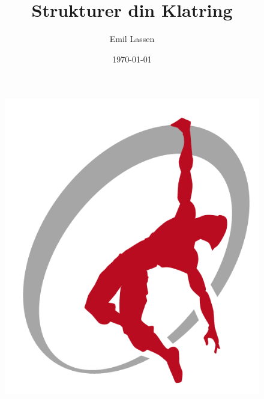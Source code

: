 \documentclass[12pt,a4paper]{article}
\title{\sc Strukturer din Klatring}
\author{Emil Lassen}
\date{\today}
\begin{document}
\maketitle
\vfill
\begin{figure}[h!]
  \raggedleft
  \includegraphics[width=.6\textwidth]{figs/aak}
\end{figure}
\clearpage


\clearpage


\clearpage


\clearpage


\clearpage


\clearpage


\end{document}
